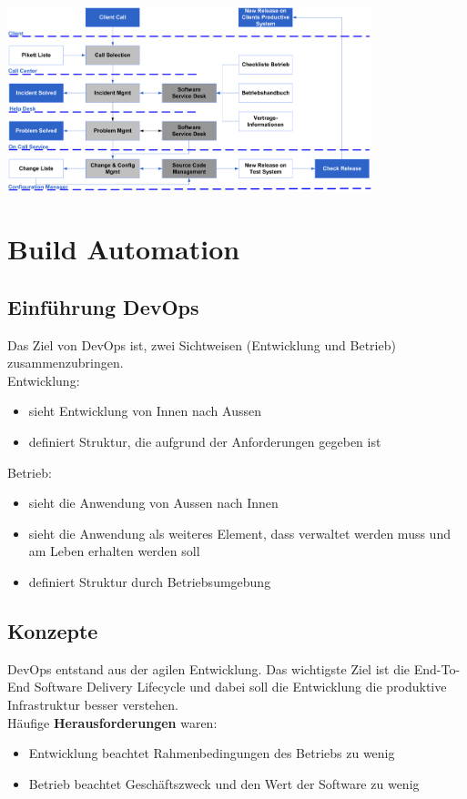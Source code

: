 \documentclass{report}
\newenvironment{Figure}
	{\par\medskip\noindent\minipage{\linewidth}}
	{\endminipage\par\medskip}
\theoremstyle{definition}
\theoremstyle{example}
\begin{document}
\begin{Figure}
\centering
\includegraphics[width=400px]{img/Change.png}
	\label{fig:Was führt zu einem Change}
\end{Figure}


\chapter{Build Automation}

\section{Einführung DevOps}
Das Ziel von DevOps ist, zwei Sichtweisen (Entwicklung und Betrieb) zusammenzubringen.\\
Entwicklung:
\begin{itemize}
	\item sieht Entwicklung von Innen nach Aussen
	\item definiert Struktur, die aufgrund der Anforderungen gegeben ist
\end{itemize}
Betrieb:
\begin{itemize}
	\item sieht die Anwendung von Aussen nach Innen
	\item sieht die Anwendung als weiteres Element, dass verwaltet werden muss und am Leben erhalten werden soll
	\item definiert Struktur durch Betriebsumgebung
\end{itemize}

\section{Konzepte}
DevOps entstand aus der agilen Entwicklung. Das wichtigste Ziel ist die End-To-End Software Delivery Lifecycle und dabei soll die Entwicklung die produktive Infrastruktur besser verstehen.\\
Häufige \textbf{Herausforderungen} waren:\\
\begin{itemize}
	\item Entwicklung beachtet Rahmenbedingungen des Betriebs zu wenig
	\item Betrieb beachtet Geschäftszweck und den Wert der Software zu wenig
\end{itemize}
\end{document}
